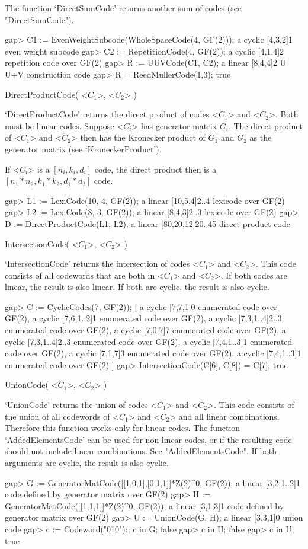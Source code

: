 The function    `DirectSumCode'   returns another   sum   of  codes  (see
"DirectSumCode").

\beginexample
gap> C1 := EvenWeightSubcode(WholeSpaceCode(4, GF(2)));
a cyclic [4,3,2]1 even weight subcode
gap> C2 := RepetitionCode(4, GF(2));
a cyclic [4,1,4]2 repetition code over GF(2)
gap> R := UUVCode(C1, C2);
a linear [8,4,4]2 U U+V construction code
gap> R = ReedMullerCode(1,3);
true 
\endexample

\>DirectProductCode( <$C_1$>, <$C_2$> )

`DirectProductCode' returns the   direct  product of codes   <$C_1$>  and
<$C_2$>. Both must be linear codes.  Suppose <$C_i$> has generator matrix
$G_i$. The direct product of  <$C_1$> and <$C_2$>  then has the Kronecker
product   of    $G_1$   and   $G_2$  as   the    generator    matrix (see
`KroneckerProduct').

If <$C_i$> is a $[n_i, k_i, d_i]$ code, the direct product then is a
$[n_1*n_2,k_1*k_2,d_1*d_2]$ code.

\beginexample
gap> L1 := LexiCode(10, 4, GF(2));
a linear [10,5,4]2..4 lexicode over GF(2)
gap> L2 := LexiCode(8, 3, GF(2));
a linear [8,4,3]2..3 lexicode over GF(2)
gap> D := DirectProductCode(L1, L2);
a linear [80,20,12]20..45 direct product code 
\endexample

\>IntersectionCode( <$C_1$>, <$C_2$> )

`IntersectionCode' returns the intersection of codes <$C_1$> and <$C_2$>.
This code consists of all codewords that are both in <$C_1$> and <$C_2$>.
If both codes are linear, the result is also  linear. If both are cyclic,
the result is also cyclic.

\beginexample
gap> C := CyclicCodes(7, GF(2));
[ a cyclic [7,7,1]0 enumerated code over GF(2),
  a cyclic [7,6,1..2]1 enumerated code over GF(2),
  a cyclic [7,3,1..4]2..3 enumerated code over GF(2),
  a cyclic [7,0,7]7 enumerated code over GF(2),
  a cyclic [7,3,1..4]2..3 enumerated code over GF(2),
  a cyclic [7,4,1..3]1 enumerated code over GF(2),
  a cyclic [7,1,7]3 enumerated code over GF(2),
  a cyclic [7,4,1..3]1 enumerated code over GF(2) ]
gap> IntersectionCode(C[6], C[8]) = C[7];
true 
\endexample

\>UnionCode( <$C_1$>, <$C_2$> )

`UnionCode' returns  the union of codes   <$C_1$> and <$C_2$>.  This code
consists of  the union of  all codewords of <$C_1$>  and  <$C_2$> and all
linear combinations. Therefore   this   function works only  for   linear
codes. The function `AddedElementsCode' can be used for non-linear codes,
or if  the  resulting code should not   include linear combinations.  See
"AddedElementsCode".  If both arguments  are  cyclic, the result  is also
cyclic.

\beginexample
gap> G := GeneratorMatCode([[1,0,1],[0,1,1]]*Z(2)^0, GF(2));
a linear [3,2,1..2]1 code defined by generator matrix over GF(2)
gap> H := GeneratorMatCode([[1,1,1]]*Z(2)^0, GF(2));
a linear [3,1,3]1 code defined by generator matrix over GF(2)
gap> U := UnionCode(G, H);
a linear [3,3,1]0 union code
gap> c := Codeword("010");; c in G;
false
gap> c in H;
false
gap> c in U;
true 
\endexample

